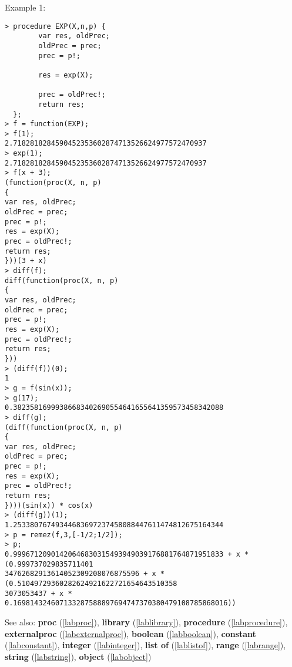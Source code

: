 \noindent Example 1: 
\begin{center}\begin{minipage}{15cm}\begin{Verbatim}[frame=single,commandchars=\\\|\~]
> procedure EXP(X,n,p) {
        var res, oldPrec;
        oldPrec = prec;
        prec = p!;
        
        res = exp(X);
        
        prec = oldPrec!;
        return res;
  };
> f = function(EXP);
> f(1);
2.7182818284590452353602874713526624977572470937
> exp(1);
2.7182818284590452353602874713526624977572470937
> f(x + 3);
(function(proc(X, n, p)
{
var res, oldPrec;
oldPrec = prec;
prec = p!;
res = exp(X);
prec = oldPrec!;
return res;
}))(3 + x)
> diff(f);
diff(function(proc(X, n, p)
{
var res, oldPrec;
oldPrec = prec;
prec = p!;
res = exp(X);
prec = oldPrec!;
return res;
}))
> (diff(f))(0);
1
> g = f(sin(x));
> g(17);
0.38235816999386683402690554641655641359573458342088
> diff(g);
(diff(function(proc(X, n, p)
{
var res, oldPrec;
oldPrec = prec;
prec = p!;
res = exp(X);
prec = oldPrec!;
return res;
})))(sin(x)) * cos(x)
> (diff(g))(1);
1.25338076749344683697237458088447611474812675164344
> p = remez(f,3,[-1/2;1/2]);
> p;
0.99967120901420646830315493949039176881764871951833 + x * (0.999737029835711401
34762682913614052309208076875596 + x * (0.51049729360282624921622721654643510358
3073053437 + x * 0.169814324607133287588897694747370380479108785868016))
\end{Verbatim}
\end{minipage}\end{center}
See also: \textbf{proc} (\ref{labproc}), \textbf{library} (\ref{lablibrary}), \textbf{procedure} (\ref{labprocedure}), \textbf{externalproc} (\ref{labexternalproc}), \textbf{boolean} (\ref{labboolean}), \textbf{constant} (\ref{labconstant}), \textbf{integer} (\ref{labinteger}), \textbf{list of} (\ref{lablistof}), \textbf{range} (\ref{labrange}), \textbf{string} (\ref{labstring}), \textbf{object} (\ref{labobject})

